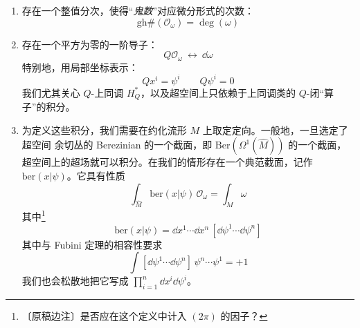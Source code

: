 \begin{enumerate}
\item 存在一个整值分次，使得“\emph{鬼数}”对应微分形式的次数：
  \begin{equation}
  \mathrm{gh}\#(\mathcal O_\omega) = \deg(\omega)
  \tag{3.13}
  \end{equation}
\item 存在一个平方为零的一阶导子：
  \begin{equation}
  Q\mathcal O_\omega\ \leftrightarrow\ \dd\omega
  \tag{3.14}
  \end{equation}
  特别地，用局部坐标表示：
  \begin{equation}
  Qx^i = \psi^i \qquad Q\psi^i = 0
  \tag{3.15}
  \end{equation}
  我们尤其关心 $Q$-上同调 $H^{\ast}_Q$，以及超空间上只依赖于上同调类的
  $Q$-闭“算子”的积分。

\item 为定义这些积分，我们需要在约化流形 $M$ 上取定定向。一般地，一旦选定了超空间
  余切丛的 Berezinian 的一个截面，即 $\mathrm{Ber}(\Omega^1(\widehat M))$ 的一个截面，
  超空间上的超场就可以积分。在我们的情形存在一个典范截面，记作
  $\mathrm{ber}(x|\psi)$。它具有性质
  \begin{equation}
  \int_{\widehat M}\mathrm{ber}(x|\psi)\,\mathcal O_\omega = \int_M\omega
  \tag{3.16}
  \end{equation}
  其中\footnote{〔原稿边注〕是否应在这个定义中计入 $(2\pi)$ 的因子？}
  \begin{equation}
  \mathrm{ber}(x|\psi) = \dd x^1\cdots\dd x^n\,[\dd\psi^1\cdots\dd\psi^n]
  \tag{3.17}
  \end{equation}
  其中与 Fubini 定理的相容性要求
  \begin{equation}
  \int[\dd\psi^1\cdots\dd\psi^n]\,\psi^n\cdots\psi^1 = +1
  \tag{3.18}
  \end{equation}
  我们也会松散地把它写成 $\prod_{i=1}^{n}\dd x^i\dd\psi^i$。
\end{enumerate}

